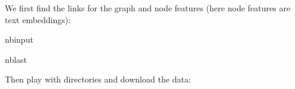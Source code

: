 \documentclass[letterpaper,10pt,english]{sphinxhowto}
\begin{document}
\sphinxAtStartPar
We first find the links for the graph and node features (here node features are text embeddings):

\begin{sphinxuseclass}{nbinput}
\begin{sphinxuseclass}{nblast}
{
\begin{sphinxVerbatim}[commandchars=\\\{\}]
\llap{\color{nbsphinxin}[1]:\,\hspace{\fboxrule}\hspace{\fboxsep}}  
  
\end{sphinxVerbatim}
}

\end{sphinxuseclass}
\end{sphinxuseclass}
\sphinxAtStartPar
Then play with directories and download the data:
\end{document}
